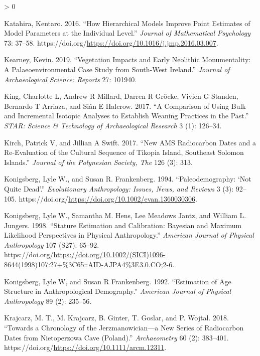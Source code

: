 \documentclass[
]{article}
\newlength{\cslhangindent}
\newenvironment{CSLReferences}[2] %
 {%
  \setlength{\parindent}{0pt}
  \ifodd #1 \everypar{\setlength{\hangindent}{\cslhangindent}}\ignorespaces\fi
  \ifnum #2 > 0
  \setlength{\parskip}{#2\baselineskip}
  \fi
 }%
 {}
\begin{document}
\begin{CSLReferences}{1}{0}
\leavevmode\hypertarget{ref-katahira_how_2016}{}%
Katahira, Kentaro. 2016. {``How Hierarchical Models Improve Point
Estimates of Model Parameters at the Individual Level.''} \emph{Journal
of Mathematical Psychology} 73: 37--58.
https://doi.org/\url{https://doi.org/10.1016/j.jmp.2016.03.007}.

\leavevmode\hypertarget{ref-kearney_vegetation_2019}{}%
Kearney, Kevin. 2019. {``Vegetation Impacts and Early {Neolithic}
Monumentality: {A} Palaeoenvironmental Case Study from South-West
{Ireland}.''} \emph{Journal of Archaeological Science: Reports} 27:
101940.

\leavevmode\hypertarget{ref-king_comparison_2017}{}%
King, Charlotte L, Andrew R Millard, Darren R Gröcke, Vivien G Standen,
Bernardo T Arriaza, and Siân E Halcrow. 2017. {``A Comparison of Using
Bulk and Incremental Isotopic Analyses to Establish Weaning Practices in
the Past.''} \emph{STAR: Science \& Technology of Archaeological
Research} 3 (1): 126--34.

\leavevmode\hypertarget{ref-kirch_new_2017}{}%
Kirch, Patrick V, and Jillian A Swift. 2017. {``New {AMS} Radiocarbon
Dates and a Re-Evaluation of the Cultural Sequence of {Tikopia}
{Island}, {Southeast} {Solomon} {Islands}.''} \emph{Journal of the
Polynesian Society, The} 126 (3): 313.

\leavevmode\hypertarget{ref-konigsberg_paleodemography_1994}{}%
Konigsberg, Lyle W., and Susan R. Frankenberg. 1994. {``Paleodemography:
{`{Not} Quite Dead'}.''} \emph{Evolutionary Anthropology: Issues, News,
and Reviews} 3 (3): 92--105.
https://doi.org/\url{https://doi.org/10.1002/evan.1360030306}.

\leavevmode\hypertarget{ref-konigsberg_stature_1998}{}%
Konigsberg, Lyle W., Samantha M. Hens, Lee Meadows Jantz, and William L.
Jungers. 1998. {``Stature Estimation and Calibration: {Bayesian} and
Maximum Likelihood Perspectives in Physical Anthropology.''}
\emph{American Journal of Physical Anthropology} 107 (S27): 65--92.
https://doi.org/\url{https://doi.org/10.1002/(SICI)1096-8644(1998)107:27+\%3C65::AID-AJPA4\%3E3.0.CO;2-6}.

\leavevmode\hypertarget{ref-konigsberg_estimation_1992}{}%
Konigsberg, Lyle W, and Susan R Frankenberg. 1992. {``Estimation of Age
Structure in Anthropological Demography.''} \emph{American Journal of
Physical Anthropology} 89 (2): 235--56.

\leavevmode\hypertarget{ref-krajcarz_towards_2018}{}%
Krajcarz, M. T., M. Krajcarz, B. Ginter, T. Goslar, and P. Wojtal. 2018.
{``Towards a {Chronology} of the {Jerzmanowician}---a {New} {Series} of
{Radiocarbon} {Dates} from {Nietoperzowa} {Cave} ({Poland}).''}
\emph{Archaeometry} 60 (2): 383--401.
https://doi.org/\url{https://doi.org/10.1111/arcm.12311}.


\end{CSLReferences}
\end{document}
